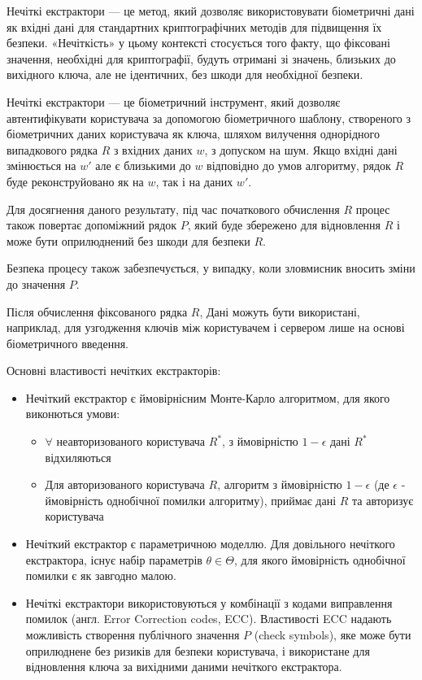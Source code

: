 \documentclass[11pt]{article}
\providecommand{\tightlist}{%
      \setlength{\itemsep}{0pt}\setlength{\parskip}{0pt}}
\begin{document}
    Нечіткі екстрактори --- це метод, який дозволяє використовувати
біометричні дані як вхідні дані для стандартних криптографічних методів
для підвищення їх безпеки. «Нечіткість» у цьому контексті стосується
того факту, що фіксовані значення, необхідні для криптографії, будуть
отримані зі значень, близьких до вихідного ключа, але не ідентичних, без
шкоди для необхідної безпеки.

Нечіткі екстрактори --- це біометричний інструмент, який дозволяє
автентифікувати користувача за допомогою біометричного шаблону,
створеного з біометричних даних користувача як ключа, шляхом вилучення
однорідного випадкового рядка \(R\) з вхідних даних \(w\), з допуском на
шум. Якщо вхідні дані змінюється на \(w'\) але є близькими до \(w\)
відповідно до умов алгоритму, рядок \(R\) буде реконструйовано як на
\(w\), так і на даних \(w'\).

Для досягнення даного результату, під час початкового обчислення \(R\)
процес також повертає допоміжний рядок \(P\), який буде збережено для
відновлення \(R\) і може бути оприлюднений без шкоди для безпеки \(R\).

Безпека процесу також забезпечується, у випадку, коли зловмисник вносить
зміни до значення \(P\).

Після обчислення фіксованого рядка \(R\), Дані можуть бути використані,
наприклад, для узгодження ключів між користувачем і сервером лише на
основі біометричного введення.

    Основні властивості нечітких екстракторів:

\begin{itemize}
\item
  Нечіткий екстрактор є ймовірнісним Монте-Карло алгоритмом, для якого
  виконються умови:

  \begin{itemize}
  \tightlist
  \item
    \(\forall\) неавторизованого користувача \(R^*\), з ймовірністю
    \(1-\epsilon\) дані \(R^*\) відхиляються
  \item
    Для авторизованого користувача \(R\), алгоритм з ймовірністю
    \(1-\epsilon\) (де \(\epsilon\) - ймовірність однобічної помилки
    алгоритму), приймає дані \(R\) та авторизує користувача
  \end{itemize}
\item
  Нечіткий екстрактор є параметричною моделлю. Для довільного нечіткого
  екстрактора, існує набір параметрів \(\theta \in \Theta\), для якого
  ймовірність однобічної помилки є як завгодно малою.
\item
  Нечіткі екстрактори використовуються у комбінації з кодами виправлення
  помилок (англ. Error Correction codes, ECC). Властивості ECC надають
  можливість створення публічного значення \(P\) (check symbols), яке
  може бути оприлюднене без ризиків для безпеки користувача, і
  використане для відновлення ключа за вихідними даними нечіткого
  екстрактора.
\end{itemize}
\end{document}
